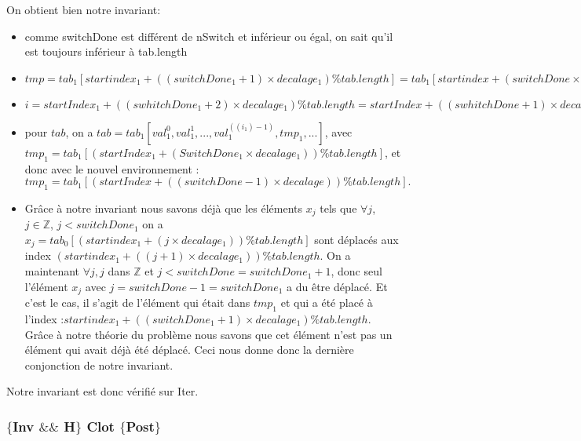 On obtient bien notre invariant:
\begin{itemize}
	\item comme switchDone est différent de nSwitch et inférieur ou égal, on sait qu'il est toujours inférieur à tab.length
	\item $tmp = tab_{1}[startindex_{1} + ((switchDone_{1}+1)\times decalage_{1}) \% tab.length] = tab_{1}[startindex + (switchDone\times decalage) \% tab.length]$
	\item $i = startIndex_{1} + ((swhitchDone_{1}+2)\times decalage_{1}) \% tab.length = startIndex + ((swhitchDone+1)\times decalage) \%tab.length$
	\item pour $tab$, on a $tab = tab_{1}[val_{1}^{0},val_{1}^{1}, ..., val_{1}^{((i_{1})-1)}, tmp_{1}, ...]$, avec $tmp_{1} = tab_{1}[(startIndex_{1} + (SwitchDone_{1}\times decalage_{1})) \% tab.length]$, et donc avec le nouvel environnement : $tmp_{1} = tab_{1}[(startIndex + ((switchDone-1)\times decalage)) \% tab.length].$ 
	\item Grâce à notre invariant nous savons déjà que les éléments $x_{j}$ tels que $\forall j$, $j \in \mathbb{Z}$, $j<switchDone_{1}$ on a $x_{j}=tab_{0}[(startindex_{1} + (j\times decalage_{1})) \% tab.length]$ sont déplacés aux index $(startindex_{1} + ((j+1)\times decalage_{1}))\% tab.length$. On a maintenant $\forall j, j$ dans $\mathbb{Z}$ et $j<switchDone=switchDone_{1} + 1$, donc seul l'élément $x_{j}$ avec $j= switchDone - 1 = switchDone_{1}$ a du être déplacé. Et c'est le cas, il s'agit de l'élément qui était dans $tmp_{1}$ et qui a été placé à l'index :$ startindex_{1} + ((switchDone_{1}+1)\times decalage_{1}) \% tab.length$. Grâce à notre théorie du problème nous savons que cet élément n'est pas un élément qui avait déjà été déplacé. Ceci nous donne donc la dernière conjonction de notre invariant. 
\end{itemize}

Notre invariant est donc vérifié sur Iter. \\

\subsubsection*{$\{$Inv $\&\&$ H$\}$ Clot $\{$Post$\}$}

